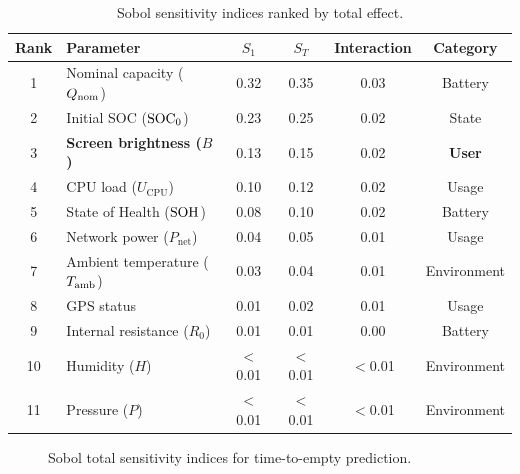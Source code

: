 \begin{table}[H]
    \centering
    \caption{Sobol sensitivity indices ranked by total effect.}
    \label{tab:sobol_results}
    \begin{tabular}{clcccc}
        \toprule
        \textbf{Rank} & \textbf{Parameter} & $S_1$ & $S_T$ & \textbf{Interaction} & \textbf{Category} \\
        \midrule
        1 & Nominal capacity ($Q_{\text{nom}}$) & 0.32 & 0.35 & 0.03 & Battery \\
        2 & Initial SOC ($\text{SOC}_0$) & 0.23 & 0.25 & 0.02 & State \\
        3 & \textbf{Screen brightness ($B$)} & 0.13 & 0.15 & 0.02 & \textbf{User} \\
        4 & CPU load ($U_{\text{CPU}}$) & 0.10 & 0.12 & 0.02 & Usage \\
        5 & State of Health ($\text{SOH}$) & 0.08 & 0.10 & 0.02 & Battery \\
        6 & Network power ($P_{\text{net}}$) & 0.04 & 0.05 & 0.01 & Usage \\
        7 & Ambient temperature ($T_{\text{amb}}$) & 0.03 & 0.04 & 0.01 & Environment \\
        \rowcolor{yellow!30}
        8 & GPS status & 0.01 & 0.02 & 0.01 & Usage \\
        \rowcolor{yellow!30}
        9 & Internal resistance ($R_0$) & 0.01 & 0.01 & 0.00 & Battery \\
        10 & Humidity ($H$) & $<$0.01 & $<$0.01 & $<$0.01 & Environment \\
        11 & Pressure ($P$) & $<$0.01 & $<$0.01 & $<$0.01 & Environment \\
        \bottomrule
    \end{tabular}
\end{table}

\begin{figure}[H]
    \centering
    \caption{Sobol total sensitivity indices for time-to-empty prediction.}
    \label{fig:sobol_bar}
\end{figure}

